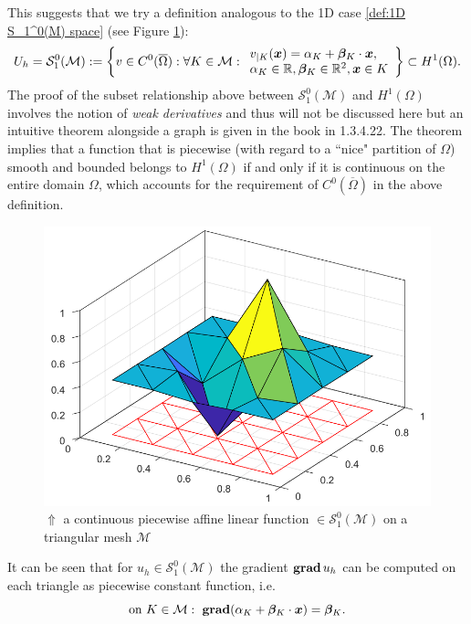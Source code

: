 	This suggests that we try a definition analogous to the 1D case 
	\eqref{def:1D S_1^0(M) space} (see Figure 
	\ref{fig:2D_piecewise_affine_linear_function_example}):
	\begin{equation}\label{def:2D S_1^0(M) space}
	U_h=\mathcal{S}_{1}^{0}(\mathcal{M}):=\left\{
	v\in C^0(\overline{\Omega}): \forall K\in\mathcal{M}:
	\begin{array}{l}
	v_{|K}(\bm{x})=\alpha_K+\bm{\beta}_K\cdot\bm{x},\\
	\alpha_K\in\mathbb{R}, \bm{\beta}_K\in\mathbb{R}^2, \bm{x}\in K
	\end{array} \right\}\subset H^1(\Omega).
	\end{equation}
	The proof of the subset relationship above between 
	$\mathcal{S}_{1}^{0}(\mathcal{M})$ and $H^1(\Omega)$ involves
	the notion of \emph{weak derivatives} and thus will not be discussed 
	here but an intuitive theorem alongside a graph is given in
	the book \cite{Hiptmair} in 1.3.4.22. The theorem implies that a function 
	that is piecewise (with regard to a ``nice" partition of $\Omega$) smooth 
	and bounded belongs to $H^1(\Omega)$ if and only if it is continuous on 
	the entire domain $\Omega$, which accounts for the requirement of
	$C^0(\overline{\Omega})$ in the above definition.
	\begin{figure}[!htbp]
		\centering
		\includegraphics[width=0.7\linewidth]{
			svg/2D_piecewise_affine_linear_function_example}
		\caption{$\Uparrow$ a continuous piecewise affine linear function
			 $\in \mathcal{S}_{1}^{0}(\mathcal{M})$ on a triangular mesh
		 	 $\mathcal{M}$ }
		\label{fig:2D_piecewise_affine_linear_function_example}
	\end{figure}
	
	It can be seen that for 
	$u_h\in\mathcal{S}_{1}^{0}(\mathcal{M})$
	the gradient $\mathbf{grad}\, u_h$ can be computed on each 
	triangle as piecewise constant function, i.e.
	\begin{equation}\label{eq:2D gradient formula}
	\textrm{on}\ K\in\mathcal{M}:\ 
	\mathbf{grad}(\alpha_K+\bm{\beta}_K\cdot\bx)=\bm{\beta}_K.
	\end{equation}\\
	
